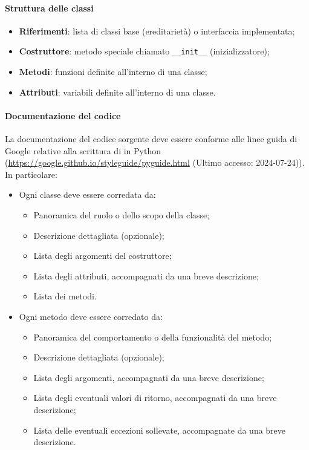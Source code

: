 \paragraph*{Struttura delle classi}
\begin{itemize}
  \item \textbf{Riferimenti}: lista di classi base (ereditarietà) o interfaccia implementata;
  \item \textbf{Costruttore}: metodo speciale chiamato \verb|__init__| (inizializzatore);
  \item \textbf{Metodi}: funzioni definite all'interno di una classe;
  \item \textbf{Attributi}: variabili definite all'interno di una classe.
\end{itemize}

\paragraph*{Documentazione del codice}
\par La documentazione del codice sorgente deve essere conforme alle linee guida di Google relative alla scrittura di  in Python (\href{https://google.github.io/styleguide/pyguide.html}{https://google.github.io/styleguide/pyguide.html} (Ultimo accesso: 2024-07-24)). In particolare:
\begin{itemize}
  \item Ogni classe deve essere corredata da:
  \begin{itemize}
    \item Panoramica del ruolo o dello scopo della classe;
    \item Descrizione dettagliata (opzionale);
    \item Lista degli argomenti del costruttore;
    \item Lista degli attributi, accompagnati da una breve descrizione;
    \item Lista dei metodi.
  \end{itemize}
  \item Ogni metodo deve essere corredato da:
  \begin{itemize}
    \item Panoramica del comportamento o della funzionalità del metodo;
    \item Descrizione dettagliata (opzionale);
    \item Lista degli argomenti, accompagnati da una breve descrizione;
    \item Lista degli eventuali valori di ritorno, accompagnati da una breve descrizione;
    \item Lista delle eventuali eccezioni sollevate, accompagnate da una breve descrizione.
  \end{itemize}
\end{itemize}

